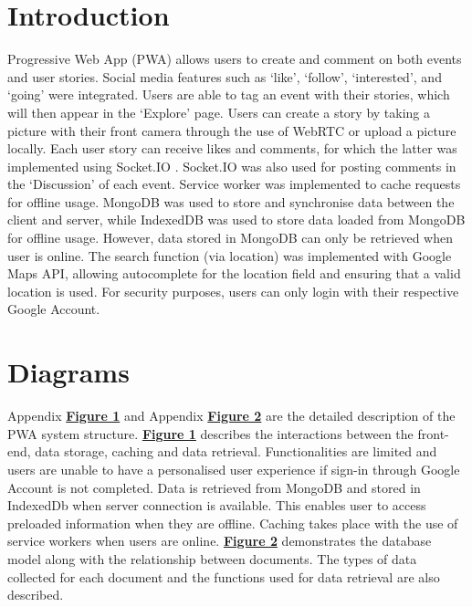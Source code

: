 \documentclass[11pt, a4paper]{article}
\begin{document}
\section{Introduction}
Progressive Web App (PWA) allows users to create and comment on both events and user stories.
Social media features such as `like', `follow', `interested', and `going' were integrated. Users are
able to tag an event with their stories, which will then appear in the `Explore' page. Users can
create a story by taking a picture with their front camera through the use of WebRTC or upload a
picture locally. Each user story can receive likes and comments, for which the latter was
implemented using Socket.IO \cite{week6, socketio}. Socket.IO was also used for posting comments in
the `Discussion' of each event. Service worker was implemented to cache requests for offline usage.
MongoDB was used to store and synchronise data between the client and server, while IndexedDB was
used to store data loaded from MongoDB for offline usage. However, data stored in MongoDB can only
be retrieved when user is online. The search function (via location) was implemented with Google
Maps API, allowing autocomplete for the location field and ensuring that a valid location is used.
For security purposes, users can only login with their respective Google Account.

\section{Diagrams}
Appendix \hyperref[figure:site_map]{\textbf{Figure 1}} and Appendix \hyperref[figure:uml]{
\textbf{Figure 2}} are the detailed description of the PWA system structure.
\hyperref[figure:site_map]{\textbf{Figure 1}} describes the interactions between the front-end,
data storage, caching and data retrieval. Functionalities are limited and users are unable to have a
personalised user experience if sign-in through Google Account is not completed. Data is retrieved
from MongoDB and stored in IndexedDb when server connection is available. This enables user to
access preloaded information when they are offline. Caching takes place with the use of service
workers when users are online. \hyperref[figure:uml]{\textbf{Figure 2}} demonstrates the database
model along with the relationship between documents. The types of data collected for each document
and the functions used for data retrieval are also described.
\end{document}
